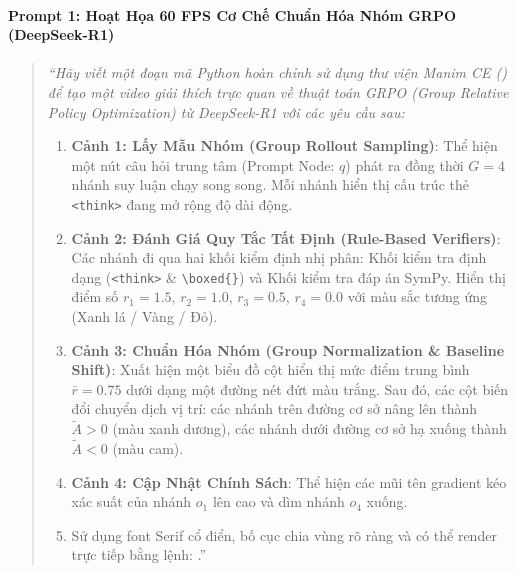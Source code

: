 \begin{simulationbox}
\paragraph{Prompt 1: Hoạt Họa 60 FPS Cơ Chế Chuẩn Hóa Nhóm GRPO (DeepSeek-R1)}
\begin{quote}\small\itshape
``Hãy viết một đoạn mã Python hoàn chỉnh sử dụng thư viện Manim CE () để tạo một video giải thích trực quan về thuật toán GRPO (Group Relative Policy Optimization) từ DeepSeek-R1 với các yêu cầu sau:
\begin{enumerate}
  \item \textbf{Cảnh 1: Lấy Mẫu Nhóm (Group Rollout Sampling)}: Thể hiện một nút câu hỏi trung tâm (Prompt Node: $q$) phát ra đồng thời $G = 4$ nhánh suy luận chạy song song. Mỗi nhánh hiển thị cấu trúc thẻ \verb|<think>| đang mở rộng độ dài động.
  \item \textbf{Cảnh 2: Đánh Giá Quy Tắc Tất Định (Rule-Based Verifiers)}: Các nhánh đi qua hai khối kiểm định nhị phân: Khối kiểm tra định dạng (\verb|<think>| \& \verb|\boxed{}|) và Khối kiểm tra đáp án SymPy. Hiển thị điểm số $r_1=1.5$, $r_2=1.0$, $r_3=0.5$, $r_4=0.0$ với màu sắc tương ứng (Xanh lá / Vàng / Đỏ).
  \item \textbf{Cảnh 3: Chuẩn Hóa Nhóm (Group Normalization \& Baseline Shift)}: Xuất hiện một biểu đồ cột hiển thị mức điểm trung bình $\bar{r} = 0.75$ dưới dạng một đường nét đứt màu trắng. Sau đó, các cột biến đổi chuyển dịch vị trí: các nhánh trên đường cơ sở nâng lên thành $\widetilde{A} > 0$ (màu xanh dương), các nhánh dưới đường cơ sở hạ xuống thành $\widetilde{A} < 0$ (màu cam).
  \item \textbf{Cảnh 4: Cập Nhật Chính Sách}: Thể hiện các mũi tên gradient kéo xác suất của nhánh $o_1$ lên cao và dìm nhánh $o_4$ xuống.
  \item Sử dụng font Serif cổ điển, bố cục chia vùng rõ ràng và có thể render trực tiếp bằng lệnh: .''
\end{enumerate}
\end{quote}


\end{simulationbox}
